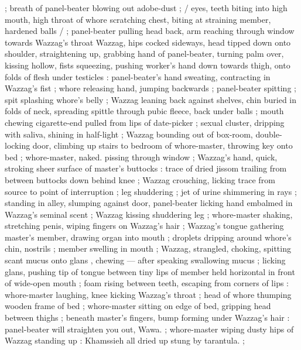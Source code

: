 ; breath of panel-beater blowing out adobe-dust ;
{\fourdots} {\slash} eyes, teeth biting into high mouth, high throat of whore scratching chest,
biting at straining member, hardened balls {\slash} {\fourdots} ; panel-beater pulling head back,
arm reaching through window towards Wazzag's throat Wazzag, hips cocked sideways, head tipped down
onto shoulder, straightening up, grabbing hand of panel-beater, turning palm over, kissing hollow,
fists squeezing, pushing worker's hand down towards thigh, onto folds of flesh under testicles :
panel-beater's hand sweating, contracting in Wazzag's fist ; whore releasing hand, jumping backwards
; panel-beater spitting ; spit splashing whore's belly ; Wazzag leaning back against shelves, chin
buried in folds of neck, spreading spittle through pubic fleece, back under balls ; mouth chewing
cigarette-end pulled from lips of date-picker ; sexual cluster, dripping with saliva, shining in
half-light ; Wazzag bounding out of box-room, double-locking door, climbing up stairs to bedroom of
whore-master, throwing key onto bed ; whore-master, naked. pissing through window ; Wazzag's hand,
quick, stroking sheer surface of master's buttocks : trace of dried jissom trailing from between
buttocks down behind knee ; Wazzag crouching, licking trace from source to point of interruption ;
leg shuddering ; jet of urine shimmering in rays ; standing in alley, slumping against door,
panel-beater licking hand embalmed in Wazzag's seminal scent ; Wazzag kissing shuddering leg ;
whore-master shaking, stretching penis, wiping fingers on Wazzag's hair ; Wazzag's tongue gathering
master's member, drawing organ into mouth ; droplets dripping around whore's chin, nostrils ; member
swelling in mouth  ; Wazzag, strangled, choking, spitting scant mucus onto glans , chewing --- after speaking {\dashcom} swallowing
mucus ; licking glans, pushing tip of tongue between tiny lips of member held horizontal in front of
wide-open mouth ; foam rising between teeth, escaping from corners of 
lips : whore-master laughing, knee kicking Wazzag's throat ; head of 
whore thumping wooden frame of bed ; whore-master sitting on edge 
of bed, gripping head between thighs ; beneath master's fingers, 
bump forming under Wazzag's hair : {\gl} {\td} panel-beater will straighten 
you out, Wawa. {\gr} ; whore-master wiping dusty hips of Wazzag standing up : {\gl} {\td} Khamssieh all dried up{\td} stung by tarantula. {\gr} ; 
